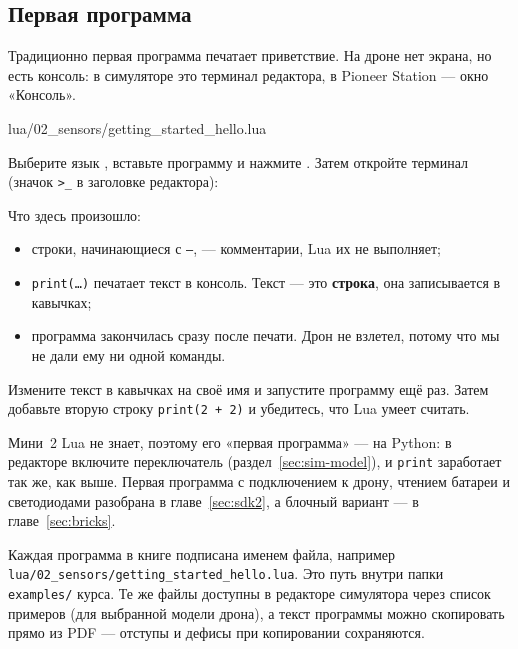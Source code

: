 \subsection{Первая программа}

Традиционно первая программа печатает приветствие. На дроне нет экрана, но есть консоль: в симуляторе это терминал редактора, в Pioneer Station --- окно «Консоль».

\begin{codefile}{lua/02_sensors/getting_started_hello.lua}
\end{codefile}

Выберите язык , вставьте программу и нажмите . Затем откройте терминал (значок \texttt{>\_} в заголовке редактора):

\begin{center}
\end{center}

Что здесь произошло:
\begin{itemize}
    \item строки, начинающиеся с \texttt{--}, --- комментарии, Lua их не выполняет;
    \item \texttt{print(\dots)} печатает текст в консоль. Текст --- это \textbf{строка}, она записывается в кавычках;
    \item программа закончилась сразу после печати. Дрон не взлетел, потому что мы не дали ему ни одной команды.
\end{itemize}

\begin{taskbox}
Измените текст в кавычках на своё имя и запустите программу ещё раз. Затем добавьте вторую строку \texttt{print(2 + 2)} и убедитесь, что Lua умеет считать.
\end{taskbox}

\begin{infobox}
Мини~2 Lua не знает, поэтому его «первая программа» --- на Python: в редакторе включите переключатель  (раздел~\ref{sec:sim-model}), и \texttt{print} заработает так же, как выше. Первая программа с подключением к дрону, чтением батареи и светодиодами разобрана в главе~\ref{sec:sdk2}, а блочный вариант --- в главе~\ref{sec:bricks}.
\end{infobox}

\begin{infobox}
Каждая программа в книге подписана именем файла, например \texttt{lua/02\_sensors/getting\_started\_hello.lua}. Это путь внутри папки \texttt{examples/} курса. Те же файлы доступны в редакторе симулятора через список примеров (для выбранной модели дрона), а текст программы можно скопировать прямо из PDF --- отступы и дефисы при копировании сохраняются.
\end{infobox}
